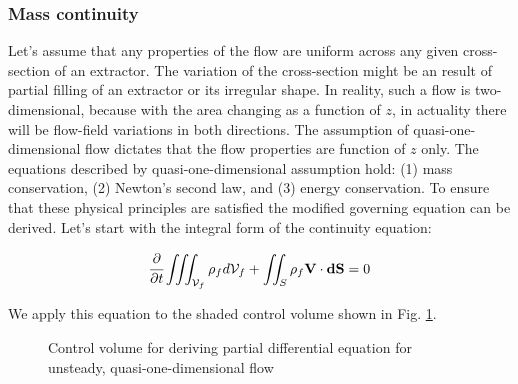 \documentclass[../Article_Model_Parameters.tex]{subfiles}
\begin{document}
	
	\subsubsection{Mass continuity}
	
	\label{CH: Gouverning equations}
	
	Let's assume that any properties of the flow are uniform across any given cross-section of an extractor. The variation of the cross-section might be an result of partial filling of an extractor or its irregular shape. In reality, such a flow is two-dimensional, because with the area changing as a function of $z$, in actuality there will be flow-field variations in both directions. The assumption of quasi-one-dimensional flow dictates that the flow properties are function of $z$ only. The equations described by quasi-one-dimensional assumption hold: (1) mass conservation, (2) Newton's second law, and (3) energy conservation. To ensure that these physical principles are satisfied the modified governing equation can be derived.	Let's start with the integral form of the continuity equation:
	
	{\footnotesize
		\begin{equation}
			\cfrac{\partial}{\partial t} \iiint_{\mathcal{V}_f} \rho_f d\mathcal{V}_f + \iint_S \rho_f \textbf{V} \cdot \textbf{dS} = 0
			\label{EQ: Continuity_integral_general}
		\end{equation}
	}
	
	We apply this equation to the shaded control volume shown in Fig. \ref{fig: control_volume}. 
	
	\begin{figure}[h]
		\centering
		\caption{Control volume for deriving partial differential equation for unsteady, quasi-one-dimensional flow}
		\label{fig: control_volume}
	\end{figure}
	
\end{document}
